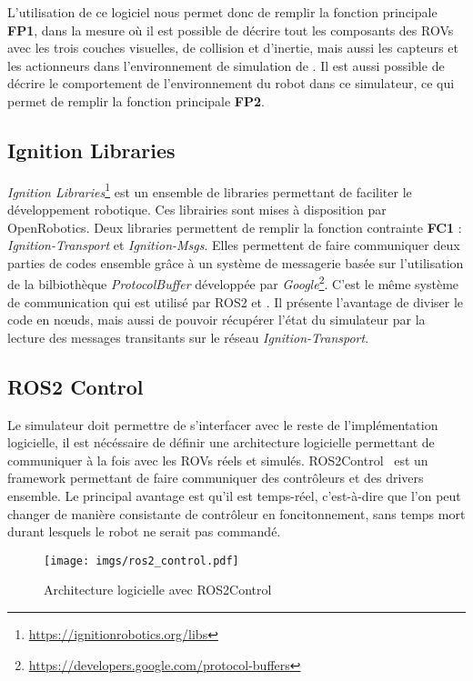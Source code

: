             L'utilisation de ce logiciel nous permet donc de remplir la fonction principale \textbf{FP1}, dans la mesure où il est possible de décrire tout les composants des \gls{ROV}s avec les trois couches visuelles, de collision et d'inertie, mais aussi les capteurs et les actionneurs dans l'environnement de simulation de \gazebo{}. Il est aussi possible de décrire le comportement de l'environnement du robot dans ce simulateur, ce qui permet de remplir la fonction principale \textbf{FP2}.

        \subsection{Ignition Libraries}

            \textit{Ignition Libraries}\footnote{\url{https://ignitionrobotics.org/libs}} est un ensemble de libraries permettant de faciliter le développement robotique. Ces librairies sont mises à disposition par \gls{OpenRobotics}. Deux libraries permettent de remplir la fonction contrainte \textbf{FC1} : \textit{Ignition-Transport} et \textit{Ignition-Msgs}. Elles permettent de faire communiquer deux parties de codes ensemble grâce à un système de messagerie basée sur l'utilisation de la bilbiothèque \textit{ProtocolBuffer} développée par \textit{Google}\footnote{\url{https://developers.google.com/protocol-buffers}}. C'est le même système de communication qui est utilisé par \gls{ROS2} et \gazebo{}. Il présente l'avantage de diviser le code en n\oe uds, mais aussi de pouvoir récupérer l'état du simulateur par la lecture des messages transitants sur le réseau \textit{Ignition-Transport}.

        \subsection{ROS2 Control}

            Le simulateur doit permettre de s'interfacer avec le reste de l'implémentation logicielle, il est nécéssaire de définir une architecture logicielle permettant de communiquer à la fois avec les \gls{ROV}s réels et simulés. \gls{ROS2Control}~\cite{ros_control} est un framework permettant de faire communiquer des contrôleurs et des drivers ensemble. Le principal avantage est qu'il est temps-réel, c'est-à-dire que l'on peut changer de manière consistante de contrôleur en foncitonnement, sans temps mort durant lesquels le robot ne serait pas commandé.

            \begin{figure}[!htb]
                \centering
                \texttt{[image: imgs/ros2\_control.pdf]}
                \caption{Architecture logicielle avec \gls{ROS2Control}}
                \label{fig:ros2_control}
            \end{figure}

